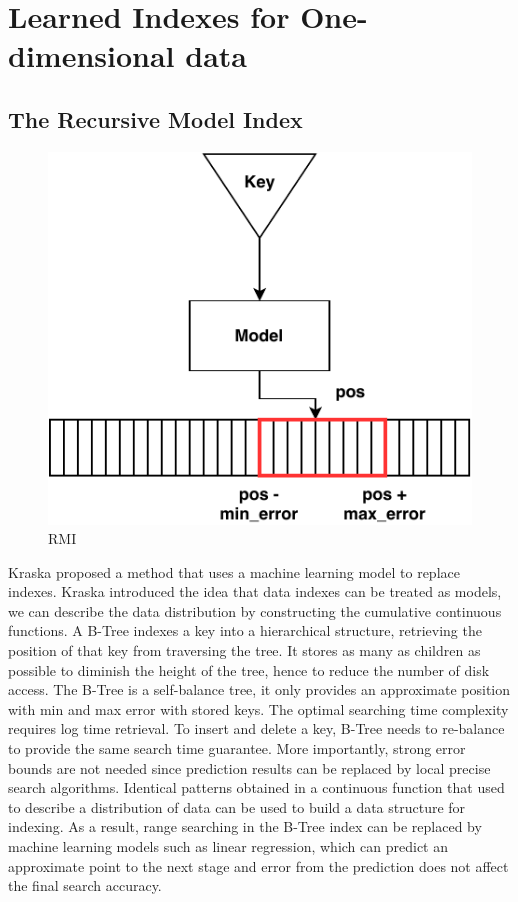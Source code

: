 \section{Learned Indexes for One-dimensional data}
\subsection{The Recursive Model Index}

\begin{figure}[ht]
\centering
\includegraphics[scale=1]{Figures/rmi.pdf}
\caption{RMI}
\label{fig:rmi}
\end{figure}

 Kraska \cite{Kraska:2017vh}  proposed a method that uses a machine learning model to replace indexes. Kraska introduced the idea that data indexes can be treated as models, we can describe the data distribution by constructing the cumulative continuous functions. A B-Tree indexes a key into a hierarchical structure, retrieving the position of that key from traversing the tree. It stores as many as children as possible to diminish the height of the tree, hence to reduce the number of disk access. The B-Tree is a self-balance tree, it only provides an approximate position with min and max error with stored keys. The optimal searching time complexity requires log time retrieval. To insert and delete a key, B-Tree needs to re-balance to provide the same search time guarantee. More importantly, strong error bounds are not needed since prediction results can be replaced by local precise search algorithms. Identical patterns obtained in a continuous function that used to describe a distribution of data can be used to build a data structure for indexing. As a result, range searching in the B-Tree index can be replaced by machine learning models such as linear regression, which can predict an approximate point to the next stage and error from the prediction does not affect the final search accuracy. 

